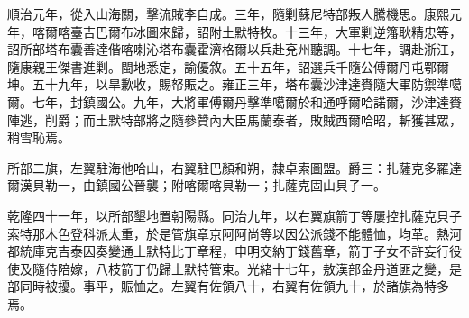 \begin{pinyinscope}
順治元年，從入山海關，擊流賊李自成。三年，隨剿蘇尼特部叛人騰機思。康熙元年，喀爾喀臺吉巴爾布冰圖來歸，詔附土默特牧。十三年，大軍剿逆籓耿精忠等，詔所部塔布囊善達偕喀喇沁塔布囊霍濟格爾以兵赴兗州聽調。十七年，調赴浙江，隨康親王傑書進剿。閩地悉定，諭優敘。五十五年，詔選兵千隨公傅爾丹屯鄂爾坤。五十九年，以旱歉收，賜帑賑之。雍正三年，塔布囊沙津達賚隨大軍防禦準噶爾。七年，封鎮國公。九年，大將軍傅爾丹擊準噶爾於和通呼爾哈諾爾，沙津達賚陣逃，削爵；而土默特部將之隨參贊內大臣馬蘭泰者，敗賊西爾哈昭，斬獲甚眾，稍雪恥焉。

所部二旗，左翼駐海他哈山，右翼駐巴顏和朔，隸卓索圖盟。爵三：扎薩克多羅達爾漢貝勒一，由鎮國公晉襲；附喀爾喀貝勒一；扎薩克固山貝子一。

乾隆四十一年，以所部墾地置朝陽縣。同治九年，以右翼旗箭丁等屢控扎薩克貝子索特那木色登科派太重，於是管旗章京阿阿尚等以因公派錢不能體恤，均革。熱河都統庫克吉泰因奏變通土默特比丁章程，申明交納丁錢舊章，箭丁子女不許妄行役使及隨侍陪嫁，八枝箭丁仍歸土默特管束。光緒十七年，敖漢部金丹道匪之變，是部同時被擾。事平，賑恤之。左翼有佐領八十，右翼有佐領九十，於諸旗為特多焉。


\end{pinyinscope}